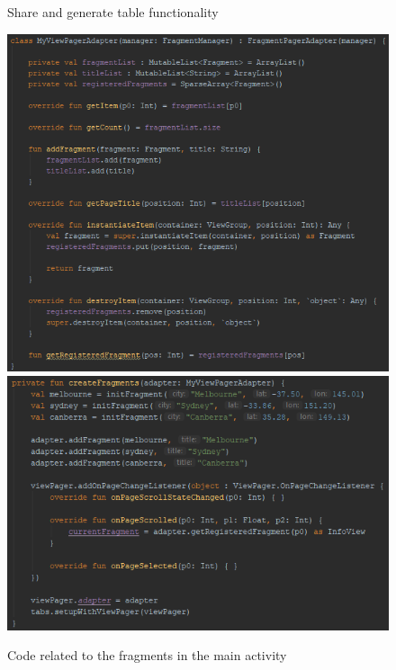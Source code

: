 \documentclass{scrartcl}
\begin{document}
\begin{figure}[h]
    \caption{Share and generate table functionality}
\end{figure}

\begin{figure}[h]
    \centering
    \includegraphics[scale=0.8]{images/screen5.png}
    \includegraphics[scale=0.8]{images/screen6.png}
    \caption{Code related to the fragments in the main activity}
\end{figure}
\end{document}
